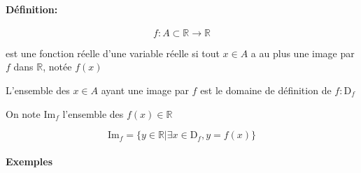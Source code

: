 \documentclass[
    11pt,
    a4paper,
    oneside,
    headinlcude, footinclude,
    twoside,
]{report}
\begin{document}
\paragraph{Définition:}
\label{par:definition_}

$$f: A \subset \mathbb{R} \to \mathbb{R}$$

est une fonction réelle d'une variable réelle si tout $x \in A$  a au plus une
image par $f$ dans $\mathbb{R}$, notée $f(x)$

L'ensemble des $x \in A$ ayant une image par $f$ est le domaine de définition
de $f: \textrm{D}_{f}$

On note $ \textrm{Im}_{f} $ l'ensemble des $f(x) \in \mathbb{R}$

$$ \textrm{Im}_{f}  = \Big\{ y \in \mathbb{R} | \exists x \in \textrm{D}_{f},
y = f(x) \Big\}$$

\paragraph{Exemples}
\label{par:exemples}
\end{document}
